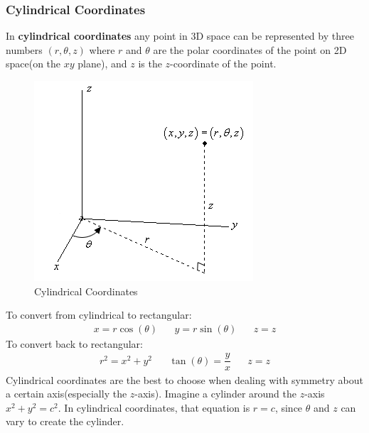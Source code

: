 \documentclass{article}
\begin{document}
\subsubsection{Cylindrical Coordinates}
In \textbf{cylindrical coordinates} any point in 3D space can be represented by three numbers $(r,\theta,z)$ where $r$ and $\theta$ are the polar coordinates of the point on 2D space(on the $xy$ plane), and $z$ is the $z$-coordinate of the point.
\begin{figure}[H]
\begin{center}
\includegraphics[scale=0.6,angle=0]{cylcoords.png}
\caption{Cylindrical Coordinates}
\label{cylcoords}
\end{center}
\end{figure}
To convert from cylindrical to rectangular:
\begin{gather*}
    x = r\cos(\theta)\hspace{20pt}y=r\sin(\theta)\hspace{20pt}z=z
\end{gather*}
To convert back to rectangular:
\begin{gather*}
    r^2 = x^2 + y^2\hspace{20pt}\tan(\theta) = \dfrac{y}{x}\hspace{20pt}z=z
\end{gather*}
Cylindrical coordinates are the best to choose when dealing with symmetry about a certain axis(especially the $z$-axis). Imagine a cylinder around the $z$-axis $x^2 + y^2 = c^2$. In cylindrical coordinates, that equation is $r=c$, since $\theta$ and $z$ can vary to create the cylinder.
\end{document}
